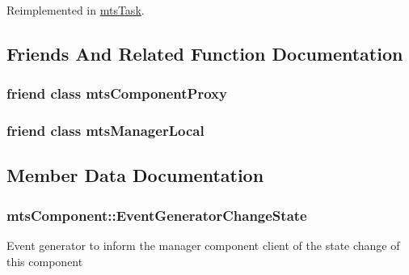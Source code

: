 Reimplemented in \hyperlink{classmts_task_a2153a26a4a92583bae49696501da212e}{mts\+Task}.



\subsection{Friends And Related Function Documentation}
\hypertarget{classmts_component_a744ae66bbeeeba6ef38e59a2dd5e9743}{}
\subsubsection[{mts\+Component\+Proxy}]{\setlength{\rightskip}{0pt plus 5cm}friend class mts\+Component\+Proxy\hspace{0.3cm}{\ttfamily [friend]}}\label{classmts_component_a744ae66bbeeeba6ef38e59a2dd5e9743}
\hypertarget{classmts_component_a31c1c611dbb103ac58ed40d84960baa0}{}
\subsubsection[{mts\+Manager\+Local}]{\setlength{\rightskip}{0pt plus 5cm}friend class {\bf mts\+Manager\+Local}\hspace{0.3cm}{\ttfamily [friend]}}\label{classmts_component_a31c1c611dbb103ac58ed40d84960baa0}


\subsection{Member Data Documentation}
\hypertarget{classmts_component_ab7019fec5126701863a90ce46c9617f9}{}
\subsubsection[{Event\+Generator\+Change\+State}]{ mts\+Component\+::\+Event\+Generator\+Change\+State\hspace{0.3cm}{\ttfamily [protected]}}\label{classmts_component_ab7019fec5126701863a90ce46c9617f9}
Event generator to inform the manager component client of the state change of this component \hypertarget{classmts_component_a6f9323d126ef72b6c3803abe4864b759}{}
